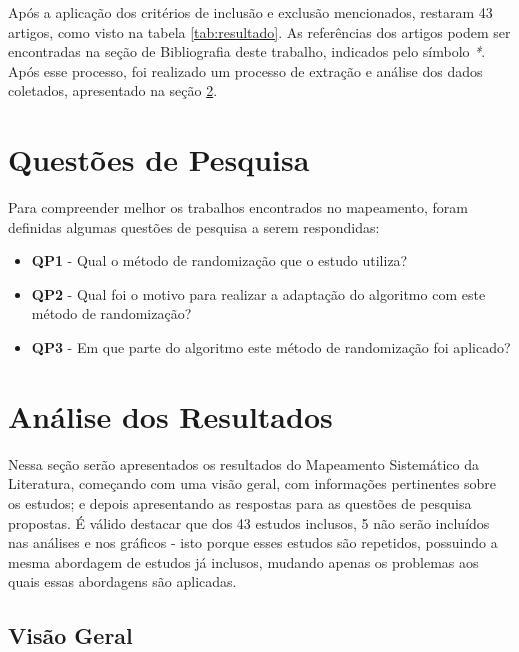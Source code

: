 Após a aplicação dos critérios de inclusão e exclusão mencionados, restaram 43 artigos, como visto na tabela \ref{tab:resultado}. As referências dos artigos podem ser encontradas na seção de Bibliografia deste trabalho, indicados pelo símbolo \textit{*}. Após esse processo, foi realizado um processo de extração e análise dos dados coletados, apresentado na seção \ref{sec:analise}.

\section{Questões de Pesquisa}

Para compreender melhor os trabalhos encontrados no mapeamento, foram definidas algumas questões de pesquisa a serem respondidas:

\begin{itemize}
    \item \textbf{QP1} - Qual o método de randomização que o estudo utiliza? 
    \item \textbf{QP2} - Qual foi o motivo para realizar a adaptação do algoritmo com este método de randomização?
    \item \textbf{QP3} - Em que parte do algoritmo este método de randomização foi aplicado?
\end{itemize}

\section{Análise dos Resultados}
\label{sec:analise}

Nessa seção serão apresentados os resultados do Mapeamento Sistemático da Literatura, começando com uma visão geral, com informações pertinentes sobre os estudos; e depois apresentando as respostas para as questões de pesquisa propostas. É válido destacar que dos 43 estudos inclusos, 5 não serão incluídos nas análises e nos gráficos - isto porque esses estudos são repetidos, possuindo a mesma abordagem de estudos já inclusos, mudando apenas os problemas aos quais essas abordagens são aplicadas.


\nocite{*}


\subsection{Visão Geral}

